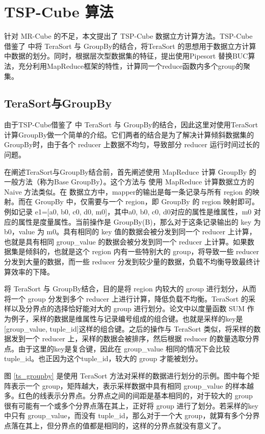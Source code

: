 \chapter{TSP-Cube 算法}

针对 MR-Cube 的不足，本文提出了 TSP-Cube 数据立方计算方法。TSP-Cube 借鉴了 \cite{tao2013minimal} 中将 TeraSort 与 GroupBy的结合，将TeraSort 的思想用于数据立方计算中数据的划分。同时，根据层次型数据集的特征，提出使用Pipesort 替换BUC算法，充分利用MapReduce框架的特性，计算同一个reduce函数内多个group的聚集。


\section{TeraSort与GroupBy}

由于TSP-Cube借鉴了 \cite{tao2013minimal} 中 TeraSort 与 GroupBy的结合，因此这里对使用TeraSort计算GroupBy做一个简单的介绍。它们两者的结合是为了解决计算倾斜数据集的GroupBy时，由于各个 reducer 上数据不均匀，导致部分 reducer 运行时间过长的问题。

在阐述TeraSort与GroupBy结合前，首先阐述使用 MapReduce 计算 GroupBy 的一般方法（称为Base GroupBy）。这个方法与 使用 MapReduce 计算数据立方的 Naive 方法类似。在 数据立方中，mapper的输出是每一条记录与所有 region 的映射。而在 GroupBy 中，仅需要与一个 region，即 GroupBy 的 region 映射即可。例如记录 e1=[a0, b0, c0, d0, m0]，其中a0, b0, c0, d0对应的属性是维属性，m0 对应的属性是度量属性。当前操作是 GroupBy(B)，那么对于这条记录输出的 key 为 b0，value 为 m0。具有相同的 key 值的数据会被分发到同一个 reducer 上计算，也就是具有相同 group\_value 的数据会被分发到同一个 reducer 上计算。如果数据集是倾斜的，也就是这个 region 内有一些特别大的 group，将导致一些 reducer 分发到大量的数据，而一些 reducer 分发到较少量的数据，负载不均衡导致最终计算效率的下降。

将 TeraSort 与 GroupBy结合，目的是将 region 内较大的 group 进行划分，从而将一个 group 分发到多个 reducer 上进行计算，降低负载不均衡。TeraSort 的采样以及分界点的选择恰好能对大的 group 进行划分。论文中以度量函数 SUM 作为例子，采样的数据是维属性与记录编号组成的组合键。也就是采样的key是[group\_value, tuple\_id]这样的组合键。之后的操作与 TeraSort 类似，将采样的数据发到一个 reducer 上，采样的数据会被排序，然后根据 reducer 的数量选取分界点。由于这里的key是复合键，因此在 group\_value 相同的情况下会比较 tuple\_id。也正因为这个tuple\_id，较大的 group 才能被划分。

图 \ref{ts_groupby} 是使用 TeraSort 方法对采样的数据进行划分的示例。图中每个矩阵表示一个 group，矩阵越大，表示采样数据中具有相同 group\_value 的样本越多。红色的线表示分界点。分界点之间的间距是基本相同的，对于较大的 group 很有可能有一个或多个分界点落在其上，正好将 group 进行了划分。若采样的key中只有 group\_value，而没有 tuple\_id，那么对于一个大 group，就算有多个分界点落在其上，但分界点的值都是相同的，这样的分界点就没有意义了。

